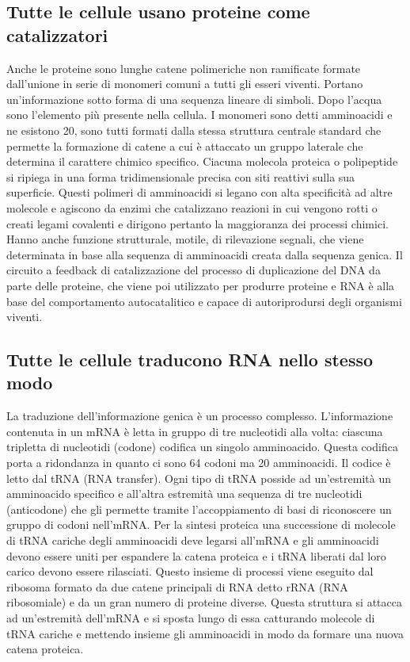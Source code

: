 \subsection{Tutte le cellule usano proteine come catalizzatori}
Anche le proteine sono lunghe catene polimeriche non ramificate formate dall'unione in serie di monomeri comuni a tutti gli esseri viventi. Portano 
un'informazione sotto forma di una sequenza lineare di simboli. Dopo l'acqua sono l'elemento pi\`u presente nella cellula. I monomeri sono detti amminoacidi
e ne esistono 20, sono tutti formati dalla stessa struttura centrale standard che permette la formazione di catene a cui \`e attaccato un gruppo laterale 
che determina il carattere chimico specifico. Ciacuna molecola proteica o polipeptide si ripiega in una forma tridimensionale precisa con siti reattivi 
sulla sua superficie. Questi polimeri di amminoacidi si legano con alta specificit\`a ad altre molecole e agiscono da enzimi che catalizzano reazioni in cui
vengono rotti o creati legami covalenti e dirigono pertanto la maggioranza dei processi chimici. Hanno anche funzione strutturale, motile, di rilevazione
segnali, che viene determinata in base alla sequenza di amminoacidi creata dalla sequenza genica. Il circuito a feedback di catalizzazione del processo di
duplicazione del DNA da parte delle proteine, che viene poi utilizzato per produrre proteine e RNA \`e alla base del comportamento autocatalitico e capace 
di autoriprodursi degli organismi viventi. 
\subsection{Tutte le cellule traducono RNA nello stesso modo}
La traduzione dell'informazione genica \`e un processo complesso. L'informazione contenuta in un mRNA \`e letta in gruppo di tre nucleotidi alla volta: 
ciascuna tripletta di nucleotidi (codone) codifica un singolo amminoacido. Questa codifica porta a ridondanza in quanto ci sono 64 codoni ma 20 amminoacidi.
Il codice \`e letto dal tRNA (RNA transfer). Ogni tipo di tRNA posside ad un'estremit\`a un amminoacido specifico e all'altra estremit\`a una sequenza di
tre nucleotidi (anticodone) che gli permette tramite l'accoppiamento di basi di riconoscere un gruppo di codoni nell'mRNA. Per la sintesi proteica una 
successione di molecole di tRNA cariche degli amminoacidi deve legarsi all'mRNA e gli amminoacidi devono essere uniti per espandere la catena proteica e i 
tRNA liberati dal loro carico devono essere rilasciati. Questo insieme di processi viene eseguito dal ribosoma formato da due catene principali di RNA
detto rRNA (RNA ribosomiale) e da un gran numero di proteine diverse. Questa struttura si attacca ad un'estremit\`a dell'mRNA e si sposta lungo di essa
catturando molecole di tRNA cariche e mettendo insieme gli amminoacidi in modo da formare una nuova catena proteica. 
